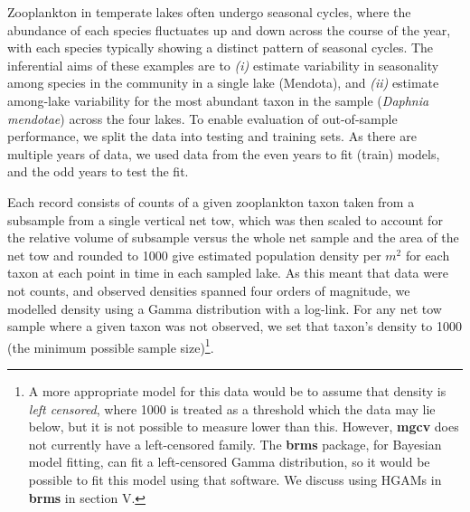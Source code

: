 \documentclass[12pt]{article}
\let\rmarkdownfootnote\footnote%
\def\footnote{\protect\rmarkdownfootnote}
\begin{document}
Zooplankton in temperate lakes often undergo seasonal cycles, where the
abundance of each species fluctuates up and down across the course of
the year, with each species typically showing a distinct pattern of
seasonal cycles. The inferential aims of these examples are to
\emph{(i)} estimate variability in seasonality among species in the
community in a single lake (Mendota), and \emph{(ii)} estimate
among-lake variability for the most abundant taxon in the sample
(\emph{Daphnia mendotae}) across the four lakes. To enable evaluation of
out-of-sample performance, we split the data into testing and training
sets. As there are multiple years of data, we used data from the even
years to fit (train) models, and the odd years to test the fit.

Each record consists of counts of a given zooplankton taxon taken from a
subsample from a single vertical net tow, which was then scaled to
account for the relative volume of subsample versus the whole net sample
and the area of the net tow and rounded to 1000 give estimated
population density per \(m^2\) for each taxon at each point in time in
each sampled lake. As this meant that data were not counts, and observed
densities spanned four orders of magnitude, we modelled density using a
Gamma distribution with a log-link. For any net tow sample where a given
taxon was not observed, we set that taxon's density to 1000 (the minimum
possible sample size)\footnote{A more appropriate model for this data
  would be to assume that density is \emph{left censored}, where 1000 is
  treated as a threshold which the data may lie below, but it is not
  possible to measure lower than this. However, \textbf{mgcv} does not
  currently have a left-censored family. The \textbf{brms} package, for
  Bayesian model fitting, can fit a left-censored Gamma distribution, so
  it would be possible to fit this model using that software. We discuss
  using HGAMs in \textbf{brms} in section V.}.
\end{document}
